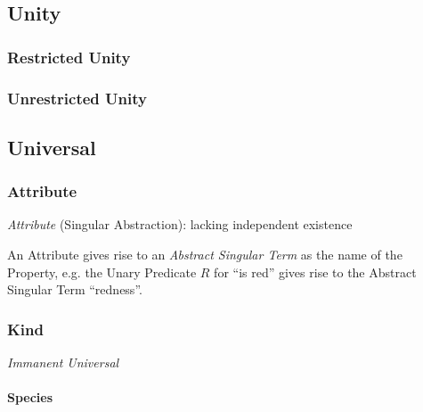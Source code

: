 \subsection{Unity}\label{sec:unity}

\subsubsection{Restricted Unity}\label{sec:restricted_unity}

\subsubsection{Unrestricted Unity}\label{sec:unrestricted_unity}




\subsection{Universal}\label{sec:universal}

\subsubsection{Attribute}\label{sec:attribute}

\emph{Attribute} (Singular Abstraction): lacking independent existence

An Attribute gives rise to an \emph{Abstract Singular Term} as the name
of the Property, e.g. the Unary Predicate $R$ for ``is red'' gives
rise to the Abstract Singular Term ``redness''. \cite{laycock10}



\subsubsection{Kind}\label{sec:kind}

\emph{Immanent Universal}



\paragraph{Species}\label{sec:species}
\hfill \\


